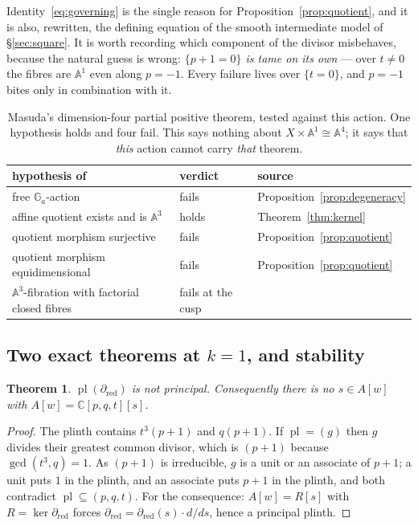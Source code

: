 \documentclass[11pt]{article}
\newtheorem{theorem}{Theorem}[section]
\theoremstyle{definition}
\theoremstyle{remark}
\newcommand{\C}{\mathbb{C}}
\newcommand{\Aff}[1]{\mathbb{A}^{#1}}
\newcommand{\Ga}{\mathbb{G}_a}
\newcommand{\pl}{\operatorname{pl}}
\begin{document}
Identity~\eqref{eq:governing} is the single reason for
Proposition~\ref{prop:quotient}, and it is also, rewritten, the defining
equation of the smooth intermediate model of \S\ref{sec:square}. It is worth
recording which component of the divisor misbehaves, because the natural guess
is wrong: \emph{$\{p+1=0\}$ is tame on its own} --- over $t\ne0$ the fibres are
$\Aff{1}$ even along $p=-1$. Every failure lives over $\{t=0\}$, and $p=-1$
bites only in combination with it.

\begin{table}[ht]
\centering
\begin{tabular}{lll}
\hline
hypothesis of~\cite[Thm.~4.3]{Masuda2025} & verdict & source \\
\hline
free $\Ga$-action & fails & Proposition~\ref{prop:degeneracy}\\
affine quotient exists and is $\Aff{3}$ & holds & Theorem~\ref{thm:kernel}\\
quotient morphism surjective & fails & Proposition~\ref{prop:quotient}\\
quotient morphism equidimensional & fails & Proposition~\ref{prop:quotient}\\
$\Aff{3}$-fibration with factorial closed fibres & fails at the cusp &
\cite[Ex.~4.2]{Masuda2025}\\
\hline
\end{tabular}
\caption{Masuda's dimension-four partial positive theorem, tested against this
action. One hypothesis holds and four fail. This says nothing about
$X\times\Aff{1}\cong\Aff{4}$; it says that \emph{this} action cannot carry
\emph{that} theorem.}\label{tab:masuda}
\end{table}

\subsection{Two exact theorems at $k=1$, and stability}

\begin{theorem}\label{thm:nonprincipal}
$\pl(\partial_{\mathrm{red}})$ is not principal. Consequently there is no
$s\in A[w]$ with $A[w]=\C[p,q,t][s]$.
\end{theorem}

\begin{proof}
The plinth contains $t^3(p+1)$ and $q(p+1)$. If $\pl=(g)$ then $g$ divides
their greatest common divisor, which is $(p+1)$ because $\gcd(t^3,q)=1$. As
$(p+1)$ is irreducible, $g$ is a unit or an associate of $p+1$; a unit puts
$1$ in the plinth, and an associate puts $p+1$ in the plinth, and both
contradict $\pl\subseteq(p,q,t)$. For the consequence: $A[w]=R[s]$ with
$R=\ker\partial_{\mathrm{red}}$ forces $\partial_{\mathrm{red}}=
\partial_{\mathrm{red}}(s)\cdot d/ds$, hence a principal plinth.
\end{proof}
\end{document}
